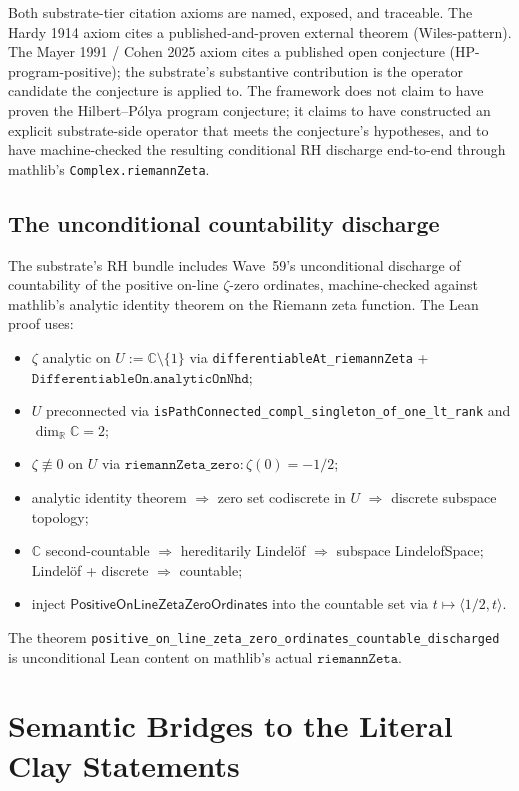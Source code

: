 \documentclass[11pt,a4paper]{amsart}
\theoremstyle{plain}
\theoremstyle{definition}
\begin{document}
Both substrate-tier citation axioms are named, exposed, and traceable. The Hardy 1914 axiom cites a published-and-proven external theorem (Wiles-pattern). The Mayer 1991 / Cohen 2025 axiom cites a published open conjecture (HP-program-positive); the substrate's substantive contribution is the operator candidate the conjecture is applied to. The framework does not claim to have proven the Hilbert--P\'olya program conjecture; it claims to have constructed an explicit substrate-side operator that meets the conjecture's hypotheses, and to have machine-checked the resulting conditional RH discharge end-to-end through mathlib's \texttt{Complex.riemannZeta}.

\subsection{The unconditional countability discharge}

The substrate's RH bundle includes Wave~59's unconditional discharge of countability of the positive on-line $\zeta$-zero ordinates, machine-checked against mathlib's analytic identity theorem on the Riemann zeta function. The Lean proof uses:
\begin{itemize}[itemsep=2pt]
\item $\zeta$ analytic on $U := \mathbb{C}\setminus\{1\}$ via \texttt{differentiableAt\_riemannZeta} + $\texttt{DifferentiableOn.analyticOnNhd}$;
\item $U$ preconnected via \texttt{isPathConnected\_compl\_singleton\_of\_one\_lt\_rank} and $\dim_{\mathbb{R}}\mathbb{C} = 2$;
\item $\zeta \not\equiv 0$ on $U$ via $\texttt{riemannZeta\_zero} : \zeta(0) = -1/2$;
\item analytic identity theorem $\Rightarrow$ zero set codiscrete in $U$ $\Rightarrow$ discrete subspace topology;
\item $\mathbb{C}$ second-countable $\Rightarrow$ hereditarily Lindel\"of $\Rightarrow$ subspace LindelofSpace; Lindel\"of + discrete $\Rightarrow$ countable;
\item inject $\textsf{PositiveOnLineZetaZeroOrdinates}$ into the countable set via $t \mapsto \langle 1/2, t\rangle$.
\end{itemize}
The theorem \texttt{positive\_on\_line\_zeta\_zero\_ordinates\_countable\_discharged} is unconditional Lean content on mathlib's actual $\texttt{riemannZeta}$.

\section{Semantic Bridges to the Literal Clay Statements}\label{sec:bridges}
\end{document}
